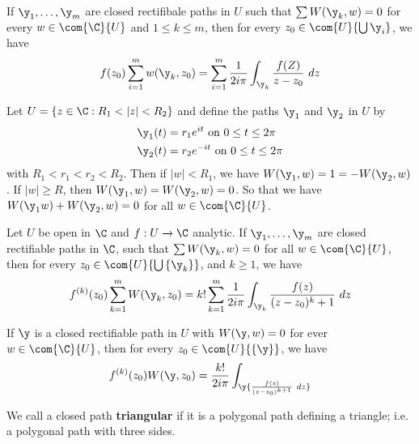 \begin{corollary}
    If $\y_1, \dots, \y_m$ are closed rectifibale paths in $U$ such that
    $\sum{W(\y_k,w)}=0$ for every $w \in \com{\C}{U}$ and $1 \leq k \leq m$,
    then for every $z_0 \in \com{U}{\bigcup{\y_i}}$, we have
    \begin{equation*}
        f(z_0)\sum_{i=1}^m{w(\y_k,z_0)}=
        \sum_{i=1}^m{\frac{1}{2i\pi}\int_{\y_k}{\frac{f(Z)}{z-z_0}} \ dz}
    \end{equation*}
\end{corollary}

\begin{example}\label{exmaple_4.4}
    Let $U=\{z \in \C : R_1<|z|<R_2\}$ and define the paths $\y_1$ and $\y_2$ in
    $U$ by
    \begin{align*}
        \y_1(t) &=  r_1e^{it} \text{ on } 0 \leq t \leq 2\pi    \\
        \y_2(t) &=  r_2e^{-it} \text{ on } 0 \leq t \leq 2\pi    \\
    \end{align*}
    with $R_1<r_1<r_2<R_2$. Then if $|w|<R_1$, we have $W(\y_1,w)=1=-W(\y_2,w)$.
    If $|w| \geq R$, then  $W(\y_1,w)=W(\y_2,w)=0$. So that we have
    $W(\y_1w)+W(\y_2,w)=0$ for all $w \in \com{\C}{U}$.
\end{example}

\begin{theorem}\label{4.5.6}
    Let $U$ be open in  $\C$ and  $f:U \xrightarrow{} \C$ analytic. If $\y_1,
    \dots, \y_m$ are closed rectifiable paths in $\C$, such that
    $\sum{W(\y_k,w)}=0$ for all $w \in \com{\C}{U}$, then for every $z_0 \in
    \com{U}{\bigcup{\{\y_k\}}}$, and $k \geq 1$, we have
    \begin{equation*}
        f^{(k)}(z_0)\sum_{k=1}^m{W(\y_k,z_0)}=
        k!\sum_{k=1}^m{\frac{1}{2i\pi}\int_{\y_k}{\frac{f(z)}{(z-z_0)^k+1} \ dz}}
    \end{equation*}
\end{theorem}
\begin{corollary}
    If $\y$ is a closed rectifiable path in  $U$ with  $W(\y,w)=0$ for ever $w
    \in \com{\C}{U}$, then for every $z_0 \in \com{U}{\{\y\}}$, we have
    \begin{equation*}
        f^{(k)}(z_0)W(\y,z_0)=
        \frac{k!}{2i\pi}\int_\y{\frac{f(z)}{(z-z_0)^{k+1}} \ dz}
    \end{equation*}
\end{corollary}

\begin{definition}
    We call a closed path \textbf{triangular} if it is a polygonal path defining
    a triangle; i.e. a polygonal path with three sides.
\end{definition}

